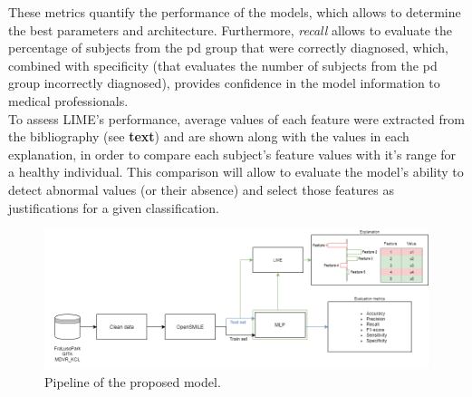 These metrics quantify the performance of the models, which allows to determine the best parameters and architecture. Furthermore, \textit{recall} allows to evaluate the percentage of subjects from the \gls{pd} group that were correctly diagnosed, which, combined with specificity (that evaluates the number of subjects from the \gls{pd} group incorrectly diagnosed), provides confidence in the model information to medical professionals.
\\
To assess LIME's performance, average values of each feature were extracted from the bibliography (see \textbf{text}) and are shown along with the values in each explanation, in order to compare each subject's feature values with it's range for a healthy individual. This comparison will allow to evaluate the model's ability to detect abnormal values (or their absence) and select those features as justifications for a given classification.

\begin{figure}[t]
	\begin{center}
		\includegraphics[clip=true, width=\textwidth]{figs/pipeline.png}
	\end{center}
	\caption{Pipeline of the proposed model.}
	\label{pipeline}
\end{figure}

\pagebreak